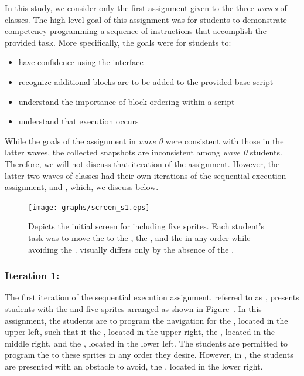 In this study, we consider only the first assignment given to the three
\emph{waves} of classes. The high-level goal of this assignment was for
students to demonstrate competency programming a sequence of instructions that
accomplish the provided task. More specifically, the goals were for students
to:

\begin{itemize}
\item have confidence using the interface
\item recognize additional blocks are to be added to the provided base script
\item understand the importance of block ordering within a script
\item understand that execution occurs \netclicked{}
\end{itemize}

While the goals of the assignment in \emph{wave 0} were consistent with those
in the latter waves, the collected snapshots are inconsistent among \emph{wave
  0} students. Therefore, we will not discuss that iteration of the
assignment. However, the latter two waves of classes had their own iterations
of the sequential execution assignment, \sone{} and \stwo{}, which, we discuss
below.

\begin{figure}[!t]
\centering
\texttt{[image: graphs/screen\_s1.eps]}
\caption{Depicts the initial screen for \sone{} including five sprites. Each
  student's task was to move the \net{} to \catch{} the \bear{}, the \horse{},
  and the \zebra{} in any order while avoiding the \snake{}. \stwo{} visually
  differs only by the absence of the \snake{}.}  
\end{figure}

\subsubsection{Iteration 1: \sone{}} 
The first iteration of the sequential execution assignment, referred to as
\sone{}, presents students with the \stage{} and five sprites arranged as shown
in Figure~. In this assignment, the students are to
program the navigation for the \net{}, located in the upper left, such that it
 the \bear{}, located in the upper right, the \horse{}, located in
the middle right, and the \zebra{}, located in the lower left. The students are
permitted to program the \net{} to \catch{} these sprites in any order they
desire. However, in \sone{}, the students are presented with an obstacle to
avoid, the \snake{}, located in the lower right.

